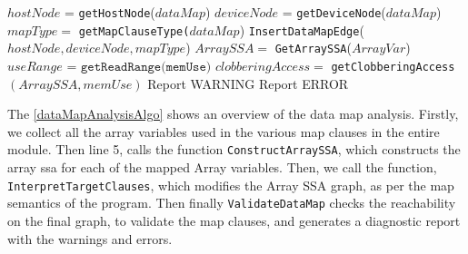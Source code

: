 \begin{algorithm}[!htbp]
\begin{algorithmic}[1]
                \EndIf                                                
            \EndFor 
        \EndFor 
            \State $hostNode$ = \texttt{getHostNode}($dataMap$)
            \State $deviceNode$ = \texttt{getDeviceNode}($dataMap$)
            \State $mapType =$ \texttt{getMapClauseType(}$ dataMap$)
                    \State {}
                    \State \texttt{InsertDataMapEdge}($hostNode, deviceNode, 
                    mapType$)
        \EndFor
        \EndFunction
            \State $ArraySSA =$ \texttt{GetArraySSA}($ArrayVar$)
                \State $useRange$ = $\texttt{getReadRange(memUse)}$
                \State $clobberingAccess =$ \texttt{getClobberingAccess}$(ArraySSA, memUse)$
                    \State Report WARNING 
                    \State Report ERROR 
                \EndIf
            \EndFor
        \EndFor    
        \EndFunction
    \end{algorithmic}
\end{algorithm}
The \autoref{dataMapAnalysisAlgo} shows an overview 
of the data map analysis. Firstly, we 
collect all the array variables used in the various
map clauses in the entire module. 
Then line 5, calls the function \texttt{ConstructArraySSA}, 
which constructs the array ssa for each of the mapped Array variables.
Then, we call the function, \texttt{InterpretTargetClauses}, 
which modifies the Array SSA graph, as per the map semantics of the 
program.
Then finally \texttt{ValidateDataMap} checks the 
reachability on the final graph, to validate 
the map clauses, and generates 
a diagnostic report with the warnings and errors.
